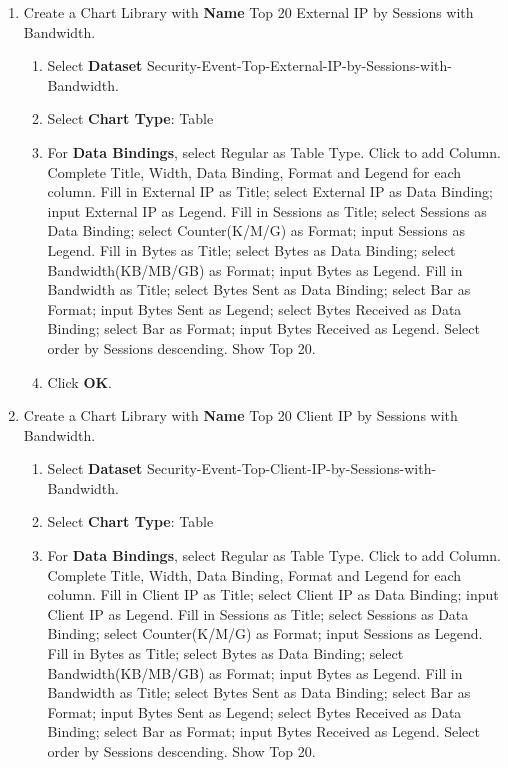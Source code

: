\begin{description}
\begin{enumerate}
\begin{enumerate}
            \item	Click \textbf{OK}.
        \end{enumerate}
        \item Create a Chart Library with \textbf{Name} Top 20 External IP by Sessions with Bandwidth.
        \begin{enumerate}
            \item	Select \textbf{Dataset} Security-Event-Top-External-IP-by-Sessions-with-Bandwidth.
            \item	Select \textbf{Chart Type}: Table
            \item	For \textbf{Data Bindings}, select Regular as Table Type. Click to add Column. Complete Title, Width, Data Binding, Format and Legend for each column. Fill in External IP as Title; select External IP as Data Binding; input External IP as Legend. Fill in Sessions as Title; select Sessions as Data Binding; select Counter(K/M/G) as Format; input Sessions as Legend. Fill in Bytes as Title; select Bytes as Data Binding; select Bandwidth(KB/MB/GB) as Format; input Bytes as Legend. Fill in Bandwidth as Title; select Bytes Sent as Data Binding; select Bar as Format; input Bytes Sent as Legend; select Bytes Received as Data Binding; select Bar as Format; input Bytes Received as Legend. Select order by Sessions descending. Show Top 20.
            \item	Click \textbf{OK}.
        \end{enumerate}
        \item Create a Chart Library with \textbf{Name} Top 20 Client IP by Sessions with Bandwidth.
        \begin{enumerate}
            \item	Select \textbf{Dataset} Security-Event-Top-Client-IP-by-Sessions-with-Bandwidth.
            \item	Select \textbf{Chart Type}: Table
            \item	For \textbf{Data Bindings}, select Regular as Table Type. Click to add Column. Complete Title, Width, Data Binding, Format and Legend for each column. Fill in Client IP as Title; select Client IP as Data Binding; input Client IP as Legend. Fill in Sessions as Title; select Sessions as Data Binding; select Counter(K/M/G) as Format; input Sessions as Legend. Fill in Bytes as Title; select Bytes as Data Binding; select Bandwidth(KB/MB/GB) as Format; input Bytes as Legend. Fill in Bandwidth as Title; select Bytes Sent as Data Binding; select Bar as Format; input Bytes Sent as Legend; select Bytes Received as Data Binding; select Bar as Format; input Bytes Received as Legend. Select order by Sessions descending. Show Top 20.

\end{enumerate}
\end{enumerate}
\end{description}
